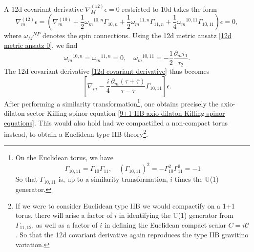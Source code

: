 A 12d covariant derivative $\nabla^{(12)}_M\epsilon = 0$ restricted to 10d takes the form
\begin{equation}
\nabla^{(12)}_m\epsilon
=\left(
\nabla^{(10)}_m
+\frac{1}{2}\omega_m{}^{10,n}\Gamma_{10,n}
+\frac{1}{2}\omega_m{}^{11,n}\Gamma_{11,n}
+\frac{1}{4}\omega_m{}^{10,11}\Gamma_{10,11}\right)\epsilon = 0,
\label{12d covariant derivative}
\end{equation}
where $\omega_{M}{}^{NP}$ denotes the spin connections.
Using the 12d metric ansatz \eqref{12d metric ansatz 0}, we find
\begin{equation}
\omega_m{}^{10,n}=\omega_m{}^{11,n}=0,\quad
\omega_m{}^{10,11} = -\frac{1}{2}\frac{\partial_m \tau_1}{\tau_2}.
\end{equation}
The 12d covariant derivative \eqref{12d covariant derivative} thus becomes
\begin{equation}
\left[
\nabla_m -\frac{i}{4}\frac{\partial_m(\tau+\bar\tau)}{\tau-\bar\tau}\Gamma_{10,11}
\right]\epsilon.
\end{equation}
After performing a similarity transformation\footnote{
On the Euclidean torus, we have
\begin{equation}
\Gamma_{10,11} = \Gamma_{10}\Gamma_{11},\quad
(\Gamma_{10,11})^2 
=-\Gamma_{10}^2\Gamma_{11}^2 = -1
\end{equation}
So that $\Gamma_{10,11}$ is, up to a similarity transformation, $i$ times the U(1) generator.
},
one obtains precisely the axio-dilaton sector Killing spinor equation \eqref{9+1 IIB axio-dilaton Killing spinor equations}.
This would also hold had we compactified a non-compact torus instead, to obtain a Euclidean type IIB theory\footnote{
If we were to consider Euclidean type IIB we would compactify on a 1+1 torus, there will arise a factor of $i$ in identifying the U(1) generator from $\Gamma_{11,12}$, as well as a factor of $i$ in defining the Euclidean compact scalar $C = i\mathcal C$. 
So that the 12d covariant derivative again reproduces the type IIB gravitino variation.
}.
